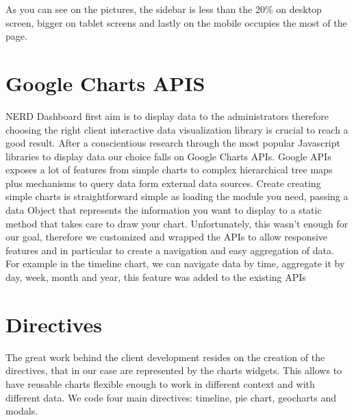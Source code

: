 \documentclass[a4paper,13pt]{report}
\begin{document}
As you can see on the pictures, the sidebar is less than the 20\% on desktop screen, bigger on tablet screens and lastly on the mobile occupies the most of the page.
\section{Google Charts APIS}
NERD Dashboard first aim is to display data to the administrators therefore choosing the right client interactive data visualization library is crucial to reach a good result.
After a  conscientious research through the most popular Javascript libraries to display data our choice falls on Google Charts APIs.
Google APIs exposes a lot of features from simple charts to complex hierarchical tree maps plus mechanisms to query data form external data sources.
Create creating simple charts is straightforward simple as loading the module you need, passing a data Object that represents the information you want to display to a static method that takes care to draw your chart.
Unfortunately, this wasn't enough for our goal, therefore we customized and wrapped the APIs to allow responsive features and in particular to create a navigation and easy aggregation of data. For example in the timeline chart, we can navigate data by time, aggregate it by day, week, month and year, this feature was added to the existing APIs 

\section{Directives}
The great work behind the client development resides on the creation of the directives, that in our case are represented by the charts widgets.
This allows to have reusable charts flexible enough to work in different context and with different data.
We code four main directives: timeline, pie chart, geocharts and modals.
\end{document}

